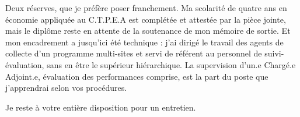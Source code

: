 \documentclass[10pt,a4paper,sans]{moderncv}
\begin{document}
Deux réserves, que je préfère poser franchement. Ma scolarité de quatre ans en économie appliquée au C.T.P.E.A est complétée et attestée par la pièce jointe, mais le diplôme reste en attente de la soutenance de mon mémoire de sortie. Et mon encadrement a jusqu'ici été technique : j'ai dirigé le travail des agents de collecte d'un programme multi-sites et servi de référent au personnel de suivi-évaluation, sans en être le supérieur hiérarchique. La supervision d'un.e Chargé.e Adjoint.e, évaluation des performances comprise, est la part du poste que j'apprendrai selon vos procédures.

Je reste à votre entière disposition pour un entretien.

\makeletterclosing
\end{document}
